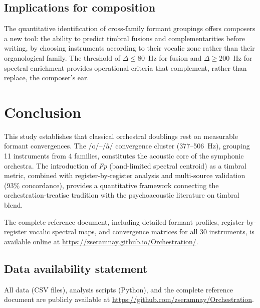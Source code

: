 \documentclass[12pt,a4paper]{article}
\begin{document}
\subsection{Implications for composition}

The quantitative identification of cross-family formant groupings offers
composers a new tool: the ability to predict timbral fusions and
complementarities before writing, by choosing instruments according to their
vocalic zone rather than their organological family. The threshold of
$\Delta \leq 80$~Hz for fusion and $\Delta \geq 200$~Hz for spectral
enrichment provides operational criteria that complement, rather than replace,
the composer's ear.

\section{Conclusion}

This study establishes that classical orchestral doublings rest on measurable
formant convergences. The /o/--/\aa/ convergence cluster (377--506~Hz), grouping
11 instruments from 4 families, constitutes the acoustic core of the symphonic
orchestra. The introduction of \textit{Fp} (band-limited spectral centroid) as a
timbral metric, combined with register-by-register analysis and multi-source
validation (93\% concordance), provides a quantitative framework connecting the
orchestration-treatise tradition with the psychoacoustic literature on timbral
blend.

The complete reference document, including detailed formant profiles, register-by-register
vocalic spectral maps, and convergence matrices for all 30 instruments, is
available online at \url{https://zseramnay.github.io/Orchestration/}.

\subsection*{Data availability statement}
All data (CSV files), analysis scripts (Python), and the complete reference
document are publicly available at
\url{https://github.com/zseramnay/Orchestration}.

\end{document}

